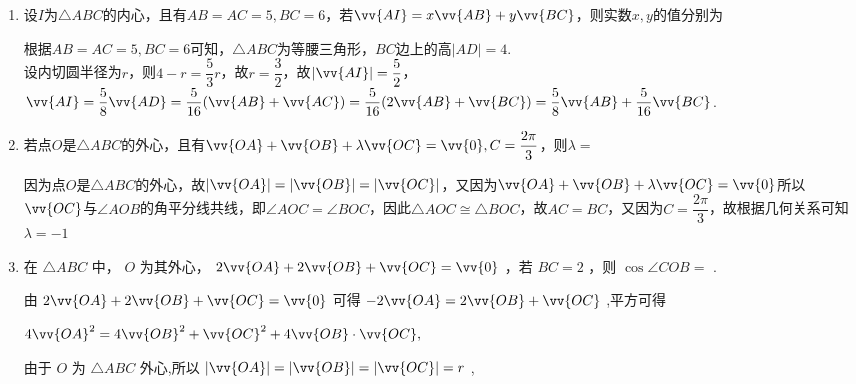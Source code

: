 \begin{enumerate}
\begin{enumerate}
        \begin{jieda}
            以$\dfrac{\vv{AC}}{|\vv{AC}|}, \dfrac{\vv{AB}}{|\vv{AB}|}, \dfrac{\vv{AC}}{|\vv{AC}|} - \dfrac{\vv{AB}}{|\vv{AB}|}$对应线段可以构建以$A$为顶点的等腰三角形，故$PA$平分$\angle A$，同理$PB$平分$\angle B$，所以$P$是$\triangle ABC$的内心。
        \end{jieda}
        \item 设$I$为$\triangle ABC$的内心，且有$AB = AC = 5, BC = 6$，若$\vv{AI} = x \vv{AB} + y \vv{BC}$，则实数$x, y$的值分别为
        \begin{jieda}
            根据$AB = AC = 5, BC = 6$可知，$\triangle ABC$为等腰三角形，$BC$边上的高$|AD| = 4$.\\
            设内切圆半径为$r$，则$4 - r = \dfrac{5}{3}r$，故$r = \dfrac{3}{2}$，故$|\vv{AI}| = \dfrac{5}{2}$，\\
            $\vv{AI} = \dfrac{5}{8}\vv{AD} = \dfrac{5}{16}(\vv{AB} + \vv{AC}) = \dfrac{5}{16}(2\vv{AB} + \vv{BC}) = \dfrac{5}{8}\vv{AB} + \dfrac{5}{16}\vv{BC}$.
        \end{jieda} 
        
        \item 若点$O$是$\triangle ABC$的外心，且有$\vv{OA} + \vv{OB} + \lambda \vv{OC} = \vv{0}, C = \dfrac{2\pi}{3}$，则$\lambda = $
        \begin{jieda}
            因为点$O$是$\triangle ABC$的外心，故$|\vv{OA}| = |\vv{OB}| = |\vv{OC}|$，又因为$\vv{OA} + \vv{OB} + \lambda \vv{OC} = \vv{0}$所以$\vv{OC}$与$\angle AOB$的角平分线共线，即$\angle AOC = \angle BOC$，因此$\triangle AOC \cong \triangle BOC$，故$AC = BC$，又因为$C = \dfrac{2\pi}{3}$，故根据几何关系可知$\lambda = -1$
        \end{jieda}

        \item 在 $\bigtriangleup  {ABC}$ 中， $O$ 为其外心， $2\vv{OA} + 2\vv{OB} + \vv{OC} = \vv{0}$ ，若 ${BC} = 2$ ，则 $\cos \angle {COB} =$ .
        \begin{jieda}
            由 $2\vv{OA} + 2\vv{OB} + \vv{OC} = \vv{0}$ 可得 $- 2\vv{OA} = 2\vv{OB} + \vv{OC}$ ,平方可得
            
            $4{\vv{OA}}^{2} = 4{\vv{OB}}^{2} + {\vv{OC}}^{2} + 4\vv{OB} \cdot  \vv{OC},$
            
            由于 $O$ 为 $\bigtriangleup {ABC}$ 外心,所以 $\left| \vv{OA}\right|  = \left| \vv{OB}\right|  = \left| \vv{OC}\right|  = r$ ,
            

\end{jieda}
\end{enumerate}
\end{enumerate}

